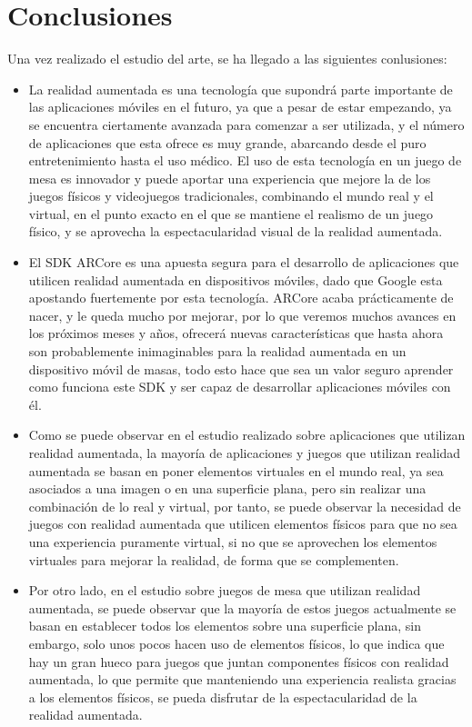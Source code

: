 \section{Conclusiones}
Una vez realizado el estudio del arte, se ha llegado a las siguientes conlusiones:
\begin{itemize}
  \item La realidad aumentada es una tecnología que supondrá parte importante de las aplicaciones móviles en el futuro, ya que a pesar de estar empezando, ya se encuentra ciertamente avanzada para comenzar a ser utilizada, y el número de aplicaciones que esta ofrece es muy grande, abarcando desde el puro entretenimiento hasta el uso médico. El uso de esta tecnología en un juego de mesa es innovador y puede aportar una experiencia que mejore la de los juegos físicos y videojuegos tradicionales, combinando el mundo real y el virtual, en el punto exacto en el que se mantiene el realismo de un juego físico, y se aprovecha la espectacularidad visual de la realidad aumentada.

  \item El SDK ARCore es una apuesta segura para el desarrollo de aplicaciones que utilicen realidad aumentada en dispositivos móviles, dado que Google esta apostando fuertemente por esta tecnología. ARCore acaba prácticamente de nacer, y le queda mucho por mejorar, por lo que veremos muchos avances en los próximos meses y años, ofrecerá nuevas características que hasta ahora son probablemente inimaginables para la realidad aumentada en un dispositivo móvil de masas, todo esto hace que sea un valor seguro aprender como funciona este SDK y ser capaz de desarrollar aplicaciones móviles con él.

  \item Como se puede observar en el estudio realizado sobre aplicaciones que utilizan realidad aumentada, la mayoría de aplicaciones y juegos que utilizan realidad aumentada se basan en poner elementos virtuales en el mundo real, ya sea asociados a una imagen o en una superficie plana, pero sin realizar una combinación de lo real y virtual, por tanto, se puede observar la necesidad de juegos con realidad aumentada que utilicen elementos físicos para que no sea una experiencia puramente virtual, si no que se aprovechen los elementos virtuales para mejorar la realidad, de forma que se complementen.

  \item Por otro lado, en el estudio sobre juegos de mesa que utilizan realidad aumentada, se puede observar que la mayoría de estos juegos actualmente se basan en establecer todos los elementos sobre una superficie plana, sin embargo, solo unos pocos hacen uso de elementos físicos, lo que indica que hay un gran hueco para juegos que juntan componentes físicos con realidad aumentada, lo que permite que manteniendo una experiencia realista gracias a los elementos físicos, se pueda disfrutar de la espectacularidad de la realidad aumentada.

\end{itemize}

